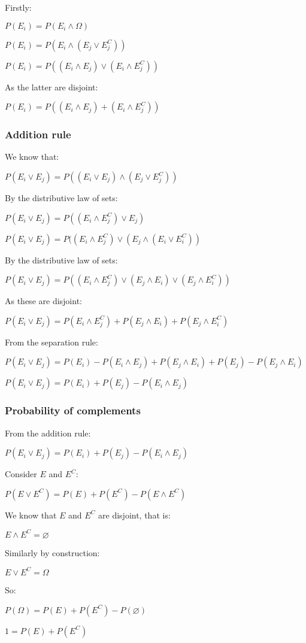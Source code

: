 Firstly:

\(P(E_i)=P(E_i\land \Omega)\)

\(P(E_i)=P(E_i\land (E_j\lor E_j^C))\)

\(P(E_i)=P((E_i\land E_j)\lor (E_i\land E_j^C))\)

As the latter are disjoint:

\(P(E_i)=P((E_i\land E_j)+(E_i\land E_j^C))\)

\subsubsection{Addition rule}

We know that:

\(P(E_i\lor E_j)=P((E_i\lor E_j)\land (E_j\lor E_j^C))\)

By the distributive law of sets:

\(P(E_i\lor E_j)=P((E_i\land E_j^C)\lor E_j)\)

\(P(E_i\lor E_j)=P((E_i\land E_j^C)\lor (E_j\land (E_i\lor E_i^C))\)

By the distributive law of sets:

\(P(E_i\lor E_j)=P((E_i\land E_j^C)\lor (E_j\land E_i)\lor (E_j\land E_i^C))\)

As these are disjoint:

\(P(E_i\lor E_j)=P(E_i\land E_j^C)+ P(E_j\land E_i)+P(E_j\land E_i^C)\)

From the separation rule:

\(P(E_i\lor E_j)=P(E_i)-P(E_i\land E_j)+ P(E_j\land E_i)+P(E_j)-P(E_j\land E_i)\)

\(P(E_i\lor E_j)=P(E_i)+P(E_j)-P(E_i\land E_j)\)

\subsubsection{Probability of complements}

From the addition rule:

\(P(E_i\lor E_j)=P(E_i)+P(E_j)-P(E_i\land E_j)\)

Consider \(E\) and \(E^C\):

\(P(E\lor E^C)=P(E)+P(E^C)-P(E\land E^C)\)

We know that \(E\) and \(E^C\) are disjoint, that is:

\(E\land E^C=\varnothing\)

Similarly by construction:

\(E\lor E^C=\Omega \)

So:

\(P(\Omega )=P(E)+P(E^C)-P(\varnothing)\)

\(1=P(E)+P(E^C)\)

